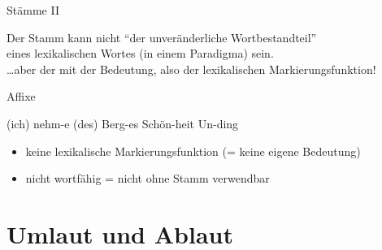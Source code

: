 \begin{frame}
  {Stämme II}
  \begin{exe}
    \ex
    \begin{xlist}
        \pause
        \pause
    \end{xlist}
  \end{exe}
  \pause
  \pause
  \pause
  \pause
  \pause
  Der \alert{Stamm} kann nicht "`der unveränderliche Wortbestandteil"'\\
  eines lexikalischen Wortes (in einem Paradigma) sein.\\
  \Zeile
  \pause
  \alert{\dots aber der mit der Bedeutung, also der lexikalischen Markierungsfunktion}!
\end{frame}

\begin{frame}
  {Affixe}
  \pause
  \begin{exe}
    \ex
    \begin{xlist}
      \ex (ich) nehm\alert<6->{-e}
      \pause
      \ex (des) Berg\alert<7->{-es}
      \pause
      \ex Schön\alert<8->{-heit}
      \pause
      \ex \alert<9->{Un-}ding
    \end{xlist}
  \end{exe}
  \Zeile
  \pause
  \pause
  \pause
  \pause
  \pause
  \begin{itemize}[<+->]
    \item \alert{keine lexikalische Markierungsfunktion} (= keine eigene Bedeutung)
    \item \alert{nicht wortfähig} = nicht ohne Stamm verwendbar
  \end{itemize}
\end{frame}

\section{Umlaut und Ablaut}

